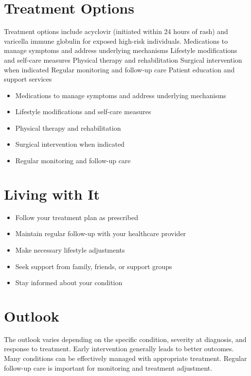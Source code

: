 \section{Treatment Options}
Treatment options include acyclovir (initiated within 24 hours of rash) and varicella immune globulin for exposed high-risk individuals. Medications to manage symptoms and address underlying mechanisms Lifestyle modifications and self-care measures Physical therapy and rehabilitation Surgical intervention when indicated Regular monitoring and follow-up care Patient education and support services

\begin{itemize}[noitemsep]
  \item Medications to manage symptoms and address underlying mechanisms
  \item Lifestyle modifications and self-care measures
  \item Physical therapy and rehabilitation
  \item Surgical intervention when indicated
  \item Regular monitoring and follow-up care
\end{itemize}
\section{Living with It}
\begin{itemize}[noitemsep]
  \item Follow your treatment plan as prescribed
  \item Maintain regular follow-up with your healthcare provider
  \item Make necessary lifestyle adjustments
  \item Seek support from family, friends, or support groups
  \item Stay informed about your condition
\end{itemize}
\section{Outlook}
The outlook varies depending on the specific condition, severity at diagnosis, and response to treatment. Early intervention generally leads to better outcomes. Many conditions can be effectively managed with appropriate treatment. Regular follow-up care is important for monitoring and treatment adjustment.
